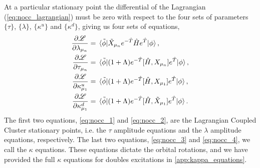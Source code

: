     At a particular stationary point the differential of the Lagrangian
    (\autoref{eq:nocc_lagrangian}) must be zero with respect to the four sets of 
    parameters $\{\tau\}$, $\{\lambda\}$, $\{\kappa^u\}$ and $\{\kappa^d\}$, giving
    us four sets of equations,
    \begin{align}
        \frac{\partial \mathscr{L}}{\partial \lambda_{\mu_n}}
            &= \mel*{\tilde{\phi}}
            {\tilde{X}_{\mu_n} e^{-\hat{T}}\hat{H}e^{\hat{T}}}
            {\phi}, 
            \label{eq:nocc_1} \\
        \frac{\partial \mathscr{L}}{\partial \tau_{\mu_n}}
            &= \mel*{\tilde{\phi}}
            {(1 + \Lambda)e^{-\hat{T}}[\hat{H}, X_{\mu_n}]e^{\hat{T}}}
            {\phi}, 
            \label{eq:nocc_2} \\
        \frac{\partial \mathscr{L}}{\partial \kappa^u_{\mu_1}}
            &= \mel*{\tilde{\phi}}
            {(1 + \Lambda)e^{-\hat{T}}[\hat{H}, X_{\mu_1}]e^{\hat{T}}}
            {\phi}, 
            \label{eq:nocc_3} \\
        \frac{\partial \mathscr{L}}{\partial \kappa^d_{\mu_1}}
            &= \mel*{\tilde{\phi}}
            {(1 + \Lambda)e^{-\hat{T}}[\hat{H}, \tilde{X}_{\mu_1}]e^{\hat{T}}}
            {\phi}.
            \label{eq:nocc_4}
    \end{align}
    The first two equations, \autoref{eq:nocc_1} and \autoref{eq:nocc_2},
    are the Lagrangian Coupled Cluster stationary points, i.e. the $\tau$ 
    amplitude equations and the $\lambda$ amplitude equations, respectively. 
    The last two equations, \autoref{eq:nocc_3} and \autoref{eq:nocc_4},
    we call the $\kappa$ equations. These equations dictate the orbital rotations,
    and we have provided the full $\kappa$ equations for doubles excitations 
    in \autoref{app:kappa_equations}.

